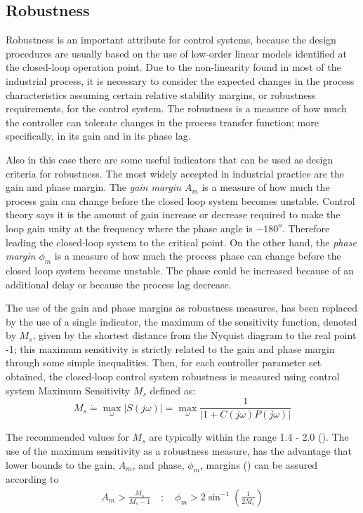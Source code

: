 \subsection{Robustness}
%
Robustness is an important attribute for control systems, because the design procedures are usually based on the use of low-order linear models identified at the closed-loop operation point. Due to the non-linearity found in most of the industrial process, it is necessary to consider the expected changes in the process characteristics assuming certain relative stability margins, or robustness requirements, for the control system. The robustness is a measure of how much the controller can tolerate changes in the process transfer function; more specifically, in its gain and in its phase lag.

Also in this case there are some useful indicators that can be used as design criteria for robustness. The most widely accepted in industrial practice are the gain and phase margin. The \emph{gain margin $A_m$} is a measure of how much the process gain can change before the closed loop system becomes unstable. Control theory says it is the amount of gain increase or decrease required to make the loop gain unity at the frequency where the phase angle is $-180^o$. Therefore leading the closed-loop system to the critical point. On the other hand, the \emph{phase margin $\phi_m$} is a measure of how much the process phase can change before the closed loop system become unstable. The phase could be increased because of an additional delay or because the process lag decrease.

The use of the gain and phase margins as robustness measures, has been replaced by the use of a single indicator, the maximum of the sensitivity function, denoted by $M_s$, given by the shortest distance from the Nyquist diagram to the real point -1; this maximum sensitivity is strictly related to the gain and phase margin through some simple inequalities. Then, for each controller parameter set obtained, the closed-loop control system robustness is measured using control system Maximum Sensitivity $M_s$ defined as:
%
\begin{equation}
M_{s} \dot{=} \max_{\omega} \left|S(j \omega)\right| = \max_{\omega} \frac{1}{\left|1+C(j \omega) P(j \omega)\right|}
\label{Eq:Ms}
\end{equation}

The recommended values for $M_s$ are typically within the range 1.4 - 2.0 (\cite{astromhagglund2006}). The use of  the maximum sensitivity as a robustness measure, has the advantage that lower bounds to the gain, $A_m$, and phase, $\phi_m$, margins (\cite{astromhagglund2006}) can be assured according to
%
\begin{eqnarray*}
    A_m > \frac{M_s}{M_s-1} \quad ; \quad \phi_m > 2 \sin^{-1} \left(\frac{1}{2 M_s} \right)
\end{eqnarray*}

